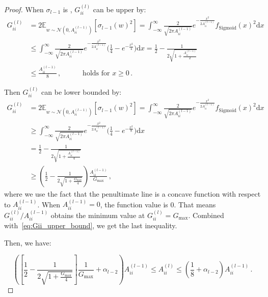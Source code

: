 \documentclass[nohyperref]{article}
\theoremstyle{plain}
\theoremstyle{definition}
\theoremstyle{remark}
\begin{document}
\begin{proof}
When $\sigma_{l-1}$ is , $G_{ii}^{(l)}$ can be upper by:
\begin{equation}
\begin{split}
    G_{ii}^{(l)}&=2\mathbb{E}_{w \sim \mathcal N(0,A_{ii}^{(l-1)})}[\sigma_{l-1}(w)^2] =\int_{-\infty}^{\infty}\frac{2}{\sqrt{2\pi A_{ii}^{(l-1)}}}e^{-\frac{x^2}{2A_{ii}^{(l-1)}}}f_{\mathrm{Sigmoid}}(x)^2 \mathrm{d}x\\
    & \leq \int_{-\infty}^{\infty}\frac{2}{\sqrt{2\pi A_{ii}^{(l-1)}}}e^{-\frac{x^2}{2A_{ii}^{(l-1)}}}\bigg(\frac{1}{4} - e^{-\frac{x^2}{4}}\bigg)\mathrm{d}x = \frac{1}{2}-\frac{1}{2\sqrt{1+\frac{A_{ii}^{(l-1)}}{2}}}\\
    & \leq \frac{A_{ii}^{(l-1)}}{8}\,,\quad\quad\quad\text{holds for $x \geq 0$}\,.
\end{split}
\label{eq:Gii_upper_bound_Sigmoid_2}
\end{equation}

Then $G_{ii}^{(l)}$ can be lower bounded by:
\begin{equation}
\begin{split}
    G_{ii}^{(l)}&=2\mathbb{E}_{w \sim \mathcal N(0,A_{ii}^{(l-1)})}[\sigma_{l-1}(w)^2] =\int_{-\infty}^{\infty}\frac{2}{\sqrt{2\pi A_{ii}^{(l-1)}}}e^{-\frac{x^2}{2A_{ii}^{(l-1)}}}f_{\mathrm{Sigmoid}}(x)^2 \mathrm{d}x\\
    & \geq \int_{-\infty}^{\infty}\frac{2}{\sqrt{2\pi A_{ii}^{(l-1)}}}e^{-\frac{x^2}{2A_{ii}^{(l-1)}}}\bigg(\frac{1}{4} - e^{-\frac{x^2}{8}}\bigg)\mathrm{d}x\\
    & =\frac{1}{2}-\frac{1}{2\sqrt{1+\frac{A_{ii}^{(l-1)}}{4}}} \\
    & \geq \left(\frac{1}{2}-\frac{1}{2\sqrt{1+\frac{G_{\max}}{4}}}\right)\frac{A_{ii}^{(l-1)}}{G_{\max}}\,,
\end{split}
\label{eq:Gii_lower_bound_Sigmoid}
\end{equation}
where we use the fact that the penultimate line is a concave function with respect to $A_{ii}^{(l-1)}$. When $A_{ii}^{(l-1)}=0$, the function value is 0. That means $G_{ii}^{(l)}/A_{ii}^{(l-1)}$ obtains the minimum value at $G_{ii}^{(l)} = G_{\max}$. Combined with~\cref{eq:Gii_upper_bound}, we get the last inequality.


Then, we have:

\begin{equation}
\left( \left[\frac{1}{2}-\frac{1}{2\sqrt{1+\frac{G_{\max}}{4}}}\right]\frac{1}{G_{\max}}+\alpha_{l-2}\right)A_{ii}^{(l-1)} \leq A_{ii}^{(l)}\leq \left(\frac{1}{8}+\alpha_{l-2}\right)A_{ii}^{(l-1)} \,.
\label{eq:Aii_bound_Sigmoid}
\end{equation}



\end{proof}
\end{document}

